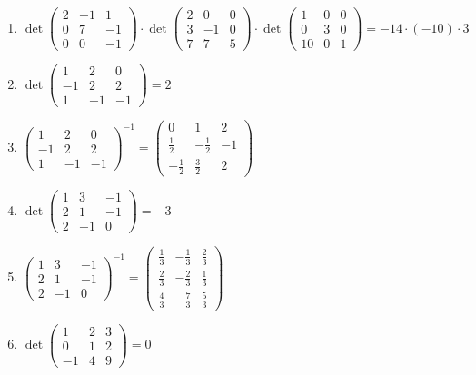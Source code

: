 \documentclass[11pt,a4paper]{article}
\begin{document}
\begin{enumerate}
\item $\displaystyle \det \begin{pmatrix} 2 & -1 & 1 \\ 0 & 7 & -1 \\ 0 & 0 & -1 \end{pmatrix} \cdot \det \begin{pmatrix} 2 & 0 & 0 \\ 3 & -1 & 0 \\ 7 & 7 & 5 \end{pmatrix} \cdot \det \begin{pmatrix} 1 & 0 & 0 \\ 0 & 3 & 0 \\ 10 & 0 & 1 \end{pmatrix} = -14 \cdot (-10) \cdot 3$
\item $\displaystyle \det \begin{pmatrix} 1 & 2 & 0 \\ -1 & 2 & 2 \\ 1 & -1 & -1 \end{pmatrix} = 2$
\item $\displaystyle \begin{pmatrix} 1 & 2 & 0 \\ -1 & 2 & 2 \\ 1 & -1 & -1 \end{pmatrix}^{-1} = \begin{pmatrix} 0 & 1 & 2 \\ \frac{1}{2} & -\frac{1}{2} & -1 \\ -\frac{1}{2} & \frac{3}{2} & 2 \end{pmatrix}$
\item $\displaystyle \det \begin{pmatrix} 1 & 3 & -1 \\ 2 & 1 & -1 \\ 2 & -1 & 0 \end{pmatrix} = -3$
\item $\displaystyle \begin{pmatrix} 1 & 3 & -1 \\ 2 & 1 & -1 \\ 2 & -1 & 0 \end{pmatrix}^{-1} = \begin{pmatrix} \frac{1}{3} & -\frac{1}{3} & \frac{2}{3} \\ \frac{2}{3} & -\frac{2}{3} & \frac{1}{3} \\ \frac{4}{3} & -\frac{7}{3} & \frac{5}{3} \end{pmatrix}$
\item $\displaystyle \det \begin{pmatrix} 1 & 2 & 3 \\ 0 & 1 & 2 \\ -1 & 4 & 9 \end{pmatrix} = 0$

\end{enumerate}
\end{document}
